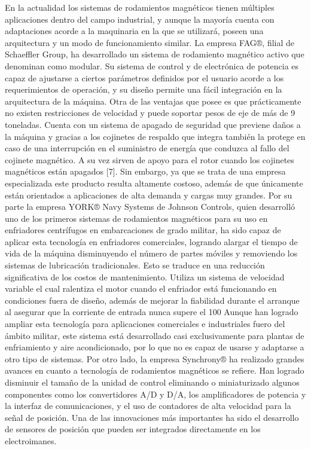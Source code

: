 En la actualidad los sistemas de rodamientos magnéticos tienen múltiples aplicaciones dentro del campo industrial, y aunque la mayoría cuenta con adaptaciones acorde a la maquinaria en la que se utilizará, poseen una arquitectura y un modo de funcionamiento similar.
La empresa FAG®, filial de Schaeffler Group, ha desarrollado un sistema de rodamiento magnético activo que denominan como modular. Su sistema de control y de electrónica de potencia es capaz de ajustarse a ciertos parámetros definidos por el usuario acorde a los requerimientos de operación, y su diseño permite una fácil integración en la arquitectura de la máquina.
Otra de las ventajas que posee es que prácticamente no existen restricciones de velocidad y puede soportar pesos de eje de más de 9 toneladas. Cuenta con un sistema de apagado de seguridad que previene daños a la máquina y gracias a los cojinetes de respaldo que integra también la protege en caso de una interrupción en el suministro de energía que conduzca al fallo del cojinete magnético. A su vez sirven de apoyo para el rotor cuando los cojinetes magnéticos están apagados [7].
Sin embargo, ya que se trata de una empresa especializada este producto resulta altamente costoso, además de que únicamente están orientados a aplicaciones de alta demanda y cargas muy grandes.
Por su parte la empresa YORK® Navy Systems de Johnson Controls, quien desarrolló uno de los primeros sistemas de rodamientos magnéticos para su uso en enfriadores centrífugos en embarcaciones de grado militar, ha sido capaz de aplicar esta tecnología en enfriadores comerciales, logrando alargar el tiempo de vida de la máquina disminuyendo el número de partes móviles y removiendo los sistemas de lubricación tradicionales. Esto se traduce en una reducción significativa de los costos de mantenimiento.
Utiliza un sistema de velocidad variable el cual ralentiza el motor cuando el enfriador está funcionando en condiciones fuera de diseño, además de mejorar la fiabilidad durante el arranque al asegurar que la corriente de entrada nunca supere el 100%
Aunque han logrado ampliar esta tecnología para aplicaciones comerciales e industriales fuero del ámbito militar, este sistema está desarrollado casi exclusivamente para plantas de enfriamiento y aire acondicionado, por lo que no es capaz de usarse y adaptarse a otro tipo de sistemas.
Por otro lado, la empresa Synchrony® ha realizado grandes avances en cuanto a tecnología de rodamientos magnéticos se refiere. Han logrado disminuir el tamaño de la unidad de control eliminando o miniaturizado algunos componentes como los convertidores A/D y D/A, los amplificadores de potencia y la interfaz de comunicaciones, y el uso de contadores de alta velocidad para la señal de posición. Una de las innovaciones más importantes ha sido el desarrollo de sensores de posición que pueden ser integrados directamente en los electroimanes.
